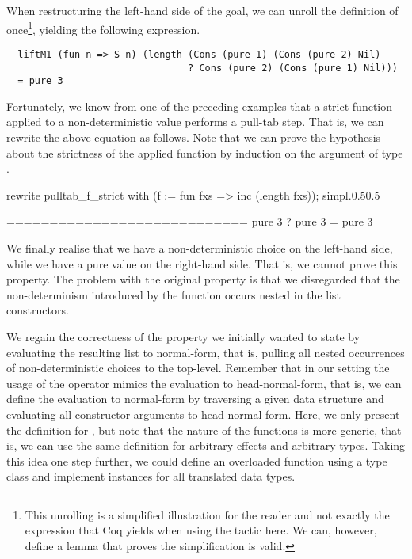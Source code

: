 When restructuring the left-hand side of the goal, we can unroll the definition of  once\footnote{This unrolling is a simplified illustration for the reader and not exactly the expression that Coq yields when using the tactic  here. We can, however, define a lemma that proves the simplification is valid.}, yielding the following expression.

\begin{verbatim}
  liftM1 (fun n => S n) (length (Cons (pure 1) (Cons (pure 2) Nil)
                                ? Cons (pure 2) (Cons (pure 1) Nil)))
  = pure 3
\end{verbatim}

Fortunately, we know from one of the preceding examples that a strict function applied to a non-deterministic value performs a pull-tab step.
That is, we can rewrite the above equation as follows.
Note that we can prove the hypothesis about the strictness of the applied function  by induction on the argument of type .

\begin{cproof1}{rewrite pulltab_f_strict with (f := fun fxs => inc (length fxs)); simpl.}{0.5}{0.5}

  ============================
  pure 3 ? pure 3 = pure 3
\end{cproof1}

We finally realise that we have a non-deterministic choice on the left-hand side, while we have a pure value on the right-hand side.
That is, we cannot prove this property.
The problem with the original property is that we disregarded that the non-determinism introduced by the function  occurs nested in the list constructors.

We regain the correctness of the property we initially wanted to state by evaluating the resulting list to normal-form, that is, pulling all nested occurrences of non-deterministic choices to the top-level.
Remember that in our setting the usage of the operator \cinl{>>=} mimics the evaluation to head-normal-form, that is, we can define the evaluation to normal-form by traversing a given data structure and evaluating all constructor arguments to head-normal-form.
Here, we only present the definition for , but note that the nature of the functions is more generic, that is, we can use the same definition for arbitrary effects and arbitrary types.
Taking this idea one step further, we could define an overloaded function  using a type class and implement instances for all translated data types.

